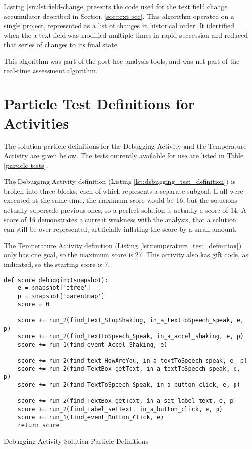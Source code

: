 Listing \ref{src:lst:field-change} presents the code used for the text field change accumulator described in Section \ref{sec:text-acc}. This algorithm operated on a single project, represented as a list of changes in historical order. It identified when the a text field was modified multiple times in rapid succession and reduced that series of changes to its final state.

This algorithm was part of the post-hoc analysis tools, and was not part of the real-time assessment algorithm.

\section{Particle Test Definitions for Activities}
\label{app:particle_definitions}
The solution particle definitions for the Debugging Activity and the Temperature Activity are given below. The tests currently available for use are listed in Table \ref{particle-tests}. 

The Debugging Activity definition (Listing \ref{lst:debugging_test_definition}) is broken into three blocks, each of which represents a separate subgoal. If all were executed at the same time, the maximum score would be 16, but the solutions actually supersede previous ones, so a perfect solution is actually a score of 14. A score of 16 demonstrates a current weakness with the analysis, that a solution can still be over-represented, artificially inflating the score by a small amount.

The Temperature Activity definition (Listing \ref{lst:temperature_test_definition}) only has one goal, so the maximum score is 27. This activity also has gift code, as indicated, so the starting score is 7. 

\begin{listing}[]
\begin{verbatim}
def score_debugging(snapshot):
    e = snapshot['etree']
    p = snapshot['parentmap']
    score = 0

    score += run_2(find_text_StopShaking, in_a_textToSpeech_speak, e, p)
    score += run_2(find_TextToSpeech_Speak, in_a_accel_shaking, e, p)
    score += run_1(find_event_Accel_Shaking, e)

    score += run_2(find_text_HowAreYou, in_a_textToSpeech_speak, e, p)
    score += run_2(find_TextBox_getText, in_a_textToSpeech_speak, e, p)
    score += run_2(find_TextToSpeech_Speak, in_a_button_click, e, p)

    score += run_2(find_TextBox_getText, in_a_set_label_text, e, p)
    score += run_2(find_Label_setText, in_a_button_click, e, p)
    score += run_1(find_event_Button_Click, e)
    return score
\end{verbatim}
\caption{Debugging Activity Solution Particle Definitions}
\label{lst:debugging_test_definition}
\end{listing}

